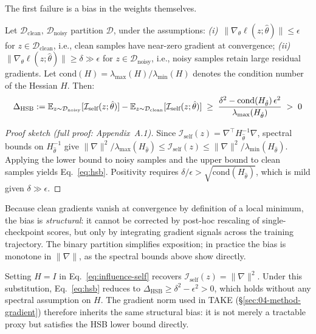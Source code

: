 \begin{foldable} %
  The first failure is a bias in the weights themselves.
  \begin{proposition} \label{prop:hsb}
    Let $\mathcal{D}_\text{clean},\, \mathcal{D}_\text{noisy}$ partition $\mathcal{D}$, under the assumptions:
    \emph{(i)}~$\|\nabla_\theta \ell(z; \hat{\theta})\| \leq \epsilon$ for $z \in \mathcal{D}_\text{clean}$, i.e., clean samples have near-zero gradient at convergence;
    \emph{(ii)} $\|\nabla_\theta \ell(z; \hat{\theta})\| \geq \delta \gg \epsilon$ for $z \in \mathcal{D}_\text{noisy}$, i.e., noisy samples retain large residual gradients.
    Let $\mathrm{cond}(H) = \lambda_{\max}(H) / \lambda_{\min}(H)$ denotes the condition number of the Hessian $H$.
    Then:
    \begin{equation}
      \Delta_\textup{HSB} := \mathbb{E}_{z \sim \mathcal{D}_\textup{noisy}}[\mathcal{I}_\textup{self}(z;\hat{\theta})]
      - \mathbb{E}_{z \sim \mathcal{D}_\textup{clean}}[\mathcal{I}_\textup{self}(z;\hat{\theta})]
      \;\geq\; \frac{\delta^2 - \mathrm{cond}(H_{\hat{\theta}})\,\epsilon^2}{\lambda_{\max}(H_{\hat{\theta}})}
      \;>\; 0
      \label{eq:hsb}
    \end{equation}
  \end{proposition}
  \begin{proof}[Proof sketch (full proof: Appendix~A.1)]
    Since $\mathcal{I}_\text{self}(z) = \nabla^\top H_{\hat\theta}^{-1} \nabla$, spectral bounds on $H_{\hat\theta}^{-1}$ give
    $\|\nabla\|^2/\lambda_{\max}(H_{\hat\theta}) \leq \mathcal{I}_\text{self}(z) \leq \|\nabla\|^2/\lambda_{\min}(H_{\hat\theta})$.
    Applying the lower bound to noisy samples and the upper bound to clean samples yields Eq.~\ref{eq:hsb}.
    Positivity requires $\delta/\epsilon > \sqrt{\mathrm{cond}(H_{\hat\theta})}$, which is mild given $\delta \gg \epsilon$.
  \end{proof}
  Because clean gradients vanish at convergence by definition of a local minimum, the bias is \emph{structural}: it cannot be corrected by post-hoc rescaling of single-checkpoint scores, but only by integrating gradient signals across the training trajectory.
  The binary partition simplifies exposition; in practice the bias is monotone in $\|\nabla\|$, as the spectral bounds above show directly.
  \begin{remark} \label{rem:grad-norm}
    Setting $H = I$ in Eq.~\ref{eq:influence-self} recovers $\mathcal{I}_\text{self}(z) = \|\nabla\|^2$.
    Under this substitution, Eq.~\ref{eq:hsb} reduces to $\Delta_\text{HSB} \geq \delta^2 - \epsilon^2 > 0$, which holds without any spectral assumption on $H$.
    The gradient norm used in TAKE (\S\ref{sec:04-method-gradient}) therefore inherits the same structural bias: it is not merely a tractable proxy but satisfies the HSB lower bound directly.
  \end{remark}
\end{foldable}


